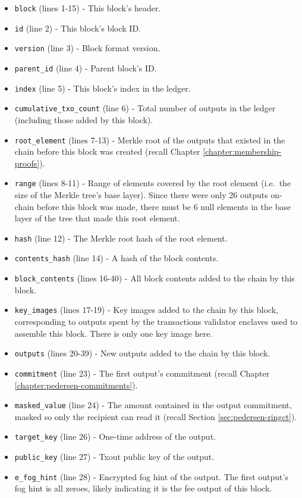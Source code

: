 \begin{appendices}
\begin{itemize}
    \item {\tt block} (lines 1-15) - This block's header.
    \item {\tt id} (line 2) - This block's block ID.
    \item {\tt version} (line 3) - Block format version.
    \item {\tt parent\_id} (line 4) - Parent block's ID.
    \item {\tt index} (line 5) - This block's index in the ledger.
    \item {\tt cumulative\_txo\_count} (line 6) - Total number of outputs in the ledger (including those added by this block).
    \item {\tt root\_element} (lines 7-13) - Merkle root of the outputs that existed in the chain before this block was created (recall Chapter \ref{chapter:membership-proofs}).
    \item {\tt range} (lines 8-11) - Range of elements covered by the root element (i.e.\ the size of the Merkle tree's base layer). Since there were only 26 outputs on-chain before this block was made, there must be 6 null elements in the base layer of the tree that made this root element.
    \item {\tt hash} (line 12) - The Merkle root hash of the root element.
    \item {\tt contents\_hash} (line 14) - A hash of the block contents.
    \item {\tt block\_contents} (lines 16-40) - All block contents added to the chain by this block.
    \item {\tt key\_images} (lines 17-19) - Key images added to the chain by this block, corresponding to outputs spent by the transactions validator enclaves used to assemble this block. There is only one key image here.
    \item {\tt outputs} (lines 20-39) - New outputs added to the chain by this block.
    \item {\tt commitment} (line 23) - The first output's commitment (recall Chapter \ref{chapter:pedersen-commitments}).
    \item {\tt masked\_value} (line 24) - The amount contained in the output commitment, masked so only the recipient can read it (recall Section \ref{sec:pedersen-ringct}).
    \item {\tt target\_key} (line 26) - One-time address of the output.
    \item {\tt public\_key} (line 27) - Txout public key of the output.
    \item {\tt e\_fog\_hint} (line 28) - Encrypted fog hint of the output. The first output's fog hint is all zeroes, likely indicating it is the fee output of this block.
\end{itemize}





\end{appendices}

